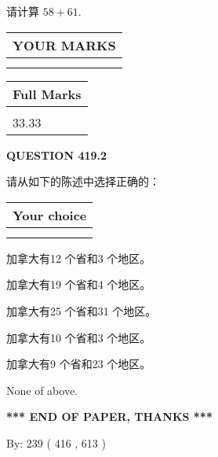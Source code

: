 \documentclass{ctexart}
\begin{document}
  
 
请计算 $ %
58 +  %
61 $.
 

 

 
  
\vspace{0.2in}
  
\noindent\begin{tabular}{|l|}
\hline
 YOUR MARKS  \\
\hline
 \\ 
 \\ 
\hline
\end{tabular}
\hspace{0.05in} \begin{tabular}{|l|}
\hline
 Full Marks  \\
\hline
 \\ 
33.33 \\
\hline
\end{tabular}
{\textbf{\Large{QUESTION
419.2 
}}}
  
  
请从如下的陈述中选择正确的：
  
  
\noindent\hspace{3.0in} \begin{tabular}{|l|}
\hline
Your choice \\
\hline
 \\ 
 \\ 
\hline
\end{tabular}
  
  
 
 
加拿大有12 个省和3 个地区。
 
 
加拿大有19 个省和4 个地区。
 
 
加拿大有25 个省和31 个地区。
 
 
加拿大有10 个省和3 个地区。
 
 
加拿大有9 个省和23 个地区。
 
 
 None of above.
 
 
   
   
 \vspace{0.2in}
 
   
   
   
   
\vspace{1.0in} 
{\textbf{\large{ *** END OF PAPER, THANKS *** }}} 
   
   
\hspace{1.0in} By: 
 239 ( 416 ,  613 )
   
\end{document}
